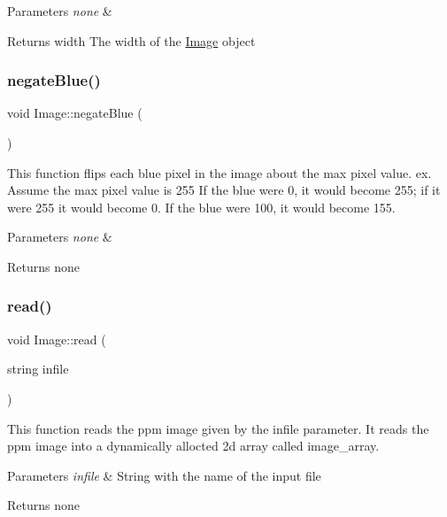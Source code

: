 \begin{DoxyParams}{Parameters}
{\em none} & \\
\hline
\end{DoxyParams}
\begin{DoxyReturn}{Returns}
width The width of the \hyperlink{class_image}{Image} object 
\end{DoxyReturn}
\mbox{\label{class_image_a47f12bc0bd85a51e20cd12a514a9411a}} 
\subsubsection{\texorpdfstring{negate\+Blue()}{negateBlue()}}
{\footnotesize\ttfamily void Image\+::negate\+Blue (\begin{DoxyParamCaption}{ }\end{DoxyParamCaption})}

This function flips each blue pixel in the image about the max pixel value. ex. Assume the max pixel value is 255 If the blue were 0, it would become 255; if it were 255 it would become 0. If the blue were 100, it would become 155.


\begin{DoxyParams}{Parameters}
{\em none} & \\
\hline
\end{DoxyParams}
\begin{DoxyReturn}{Returns}
none 
\end{DoxyReturn}
\mbox{\label{class_image_afd7841c2016dc76156a43cc4cd348680}} 
\subsubsection{\texorpdfstring{read()}{read()}}
{\footnotesize\ttfamily void Image\+::read (\begin{DoxyParamCaption}\item[{string}]{infile }\end{DoxyParamCaption})}

This function reads the ppm image given by the infile parameter. It reads the ppm image into a dynamically allocted 2d array called image\+\_\+array.


\begin{DoxyParams}{Parameters}
{\em infile} & String with the name of the input file \\
\hline
\end{DoxyParams}
\begin{DoxyReturn}{Returns}
none 
\end{DoxyReturn}
\mbox{\label{class_image_a6e15783dcc55c301f4e887e27a7c38be}} 
